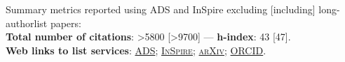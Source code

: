 Summary metrics reported using ADS and InSpire excluding [including] long-authorlist papers:
\\
\textcolor{mark_color}{\textbf{Total number of citations}}: >5800 [>9700]
 --- 
\textcolor{mark_color}{\textbf{h-index}}: 43 [47].
\\
\textcolor{mark_color}{\textbf{Web links to list services}}:
\href{https://davidegerosa.com/myads}{\textsc{ADS}};
\href{https://davidegerosa.com/myinspire}{\textsc{InSpire}};
\href{http://davidegerosa.com/myarxiv}{\textsc{arXiv}};
\href{https://davidegerosa.com/myorcid}{\textsc{ORCID}}.